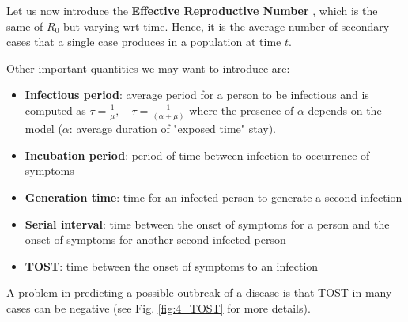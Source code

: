 \documentclass[../main/main.tex]{subfiles}
\begin{document}
Let us now introduce the \textbf{Effective Reproductive Number} , which is the same of $R_0$ but varying wrt time. Hence, it is the average number of secondary cases that a single case produces in a population at time $t$.

Other important quantities we may want to introduce are:

\begin{itemize}
    \item \textbf{Infectious period}: average period for a person to be infectious and is computed as $ \tau = \frac{1}{\mu }, \quad \tau = \frac{1}{(\alpha + \mu )} $ where the presence of $\alpha$ depends on the model ($\alpha$: average duration of "exposed time" stay).
    \item \textbf{Incubation period}: period of time between infection to occurrence of symptoms
    \item \textbf{Generation time}: time for an infected person to generate a second infection
    \item \textbf{Serial interval}: time between the onset of symptoms for a person and the onset of symptoms for another second infected person
    \item \textbf{TOST}: time between the onset of symptoms to an infection
    
\end{itemize}
A problem in predicting a possible outbreak of a disease is that TOST in many cases can be negative (see Fig. \ref{fig:4_TOST} for more details).
\end{document}
